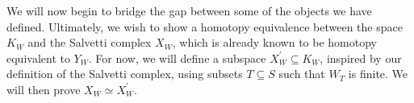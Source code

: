 \documentclass[class=article, crop=false]{standalone}
\begin{document}
We will now begin to bridge the gap between some of the objects we have defined. Ultimately, we wish to show a homotopy equivalence between the space $K_{W}$ and the Salvetti complex $X_W$, which is already known to be homotopy equivalent to $Y_W$. For now, we will define a subspace $X_{W}^\prime \subseteq K_{W}$, inspired by our definition of the Salvetti complex, using subsets $T\subseteq S$ such that $W_T$ is finite. We will then prove $X_W \simeq X^\prime_W$.
\end{document}
